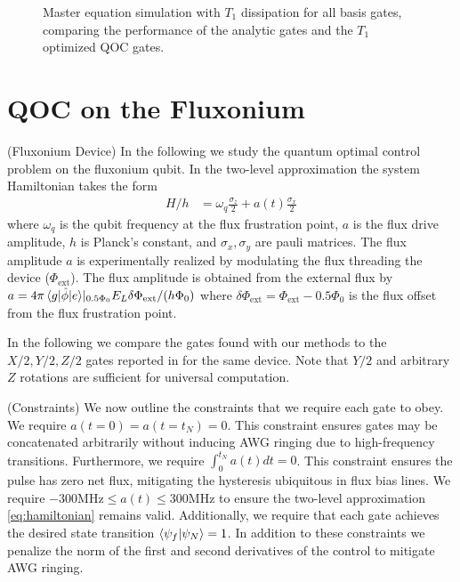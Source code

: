 \documentclass[
  amsfonts,
  amsmath,
  tbtags,
  amssymb,
  aps,
  nobibnotes,
  twocolumn,
]{revtex4-2}
\begin{document}
\begin{figure}[ht]
\begin{subfigure}{.3\linewidth}
    \label{fig:sub-third}
  \end{subfigure}
  \caption{Master equation simulation with $T_{1}$ dissipation for all basis gates,
    comparing the performance of the analytic gates and the $T_{1}$ optimized QOC gates.}
  \label{fig:fig}
\end{figure}

\section{QOC on the Fluxonium}
(Fluxonium Device) In the following we study
the quantum optimal control problem on the fluxonium qubit.
In the two-level
approximation the system Hamiltonian takes the form
\label{eq:hamiltonian}
\begin{align}
  H/h &= \omega_{q} \frac{\sigma_{z}}{2} + a(t) \frac{\sigma_{x}}{2}
\end{align}
where $\omega_{q}$ is the qubit frequency at the flux frustration point,
$a$ is the flux drive amplitude, $h$ is Planck's constant, and $\sigma_{x}, \sigma_{y}$
are pauli matrices. The flux amplitude $a$ is experimentally
realized by modulating the flux 
threading the device ($\Phi_{\textrm{ext}}$).
The flux amplitude is obtained from the external flux by
$a = 4 \pi \braket{g \lvert \hat{\phi} \rvert e} \rvert_{0.5 \Phi_{0}} E_{L}
\delta \Phi_{\textrm{ext}} / (h \Phi_{0})$
where $\delta \Phi_{\textrm{ext}} = \Phi_{\textrm{ext}} - 0.5 \Phi_{0}$ is the flux
offset from the flux frustration point.

In the following we compare the gates found with our methods
to the $X/2, Y/2, Z/2$ gates reported in \cite{zhang2020universal}
for the same device. Note that $Y/2$ and arbitrary $Z$ rotations
are sufficient for universal computation.

(Constraints) We now outline the constraints that we require each gate
to obey.
We require $a(t = 0) = a(t = t_{N}) = 0$.
This constraint ensures gates may be concatenated arbitrarily without
inducing AWG ringing due to high-frequency transitions.
Furthermore, we require $\int_{0}^{t_{N}} a(t) dt = 0$. This
constraint ensures the pulse has zero net flux, mitigating
the hysteresis ubiquitous in flux bias lines.
We require $-300 \textrm{MHz} \le a(t) \le 300 \textrm{MHz}$
to ensure the two-level approximation \ref{eq:hamiltonian}
remains valid. Additionally, we require that each gate achieves
the desired state transition $\braket{\psi_{f} \lvert \psi_{N}} = 1$.
In addition to these constraints we penalize the norm
of the first and second derivatives of the control
to mitigate AWG ringing.
\end{document}

